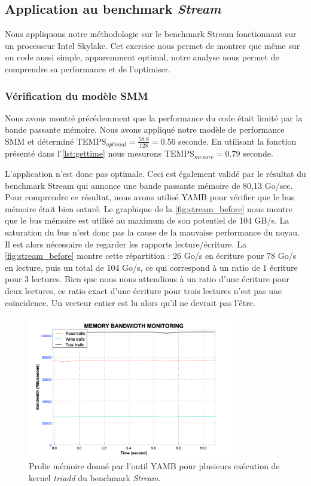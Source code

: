 \subsection{Application au benchmark \textit{Stream}}

Nous appliquons notre méthodologie sur le benchmark Stream fonctionnant sur un processeur Intel Skylake. Cet exercice nous permet de montrer que même sur un code aussi simple, apparemment optimal, notre analyse nous permet de comprendre sa performance et de l'optimiser.


\subsubsection{Vérification du modèle SMM}

Nous avons montré précédemment que la performance du code était limité par la bande passante mémoire. Nous avons appliqué notre modèle de performance SMM et déterminé $\text{TEMPS}_{optimal} = \frac{58.8}{128} = 0.56$ seconde. En utilisant la fonction présenté dans l'\autoref{lst:gettime} nous mesurons $\text{TEMPS}_{mesure} = 0.79$ seconde.

L'application n'est donc pas optimale. Ceci est également validé par le résultat du benchmark Stream qui annonce une bande passante mémoire de 80,13 Go/sec. Pour comprendre ce résultat, nous avons utilisé YAMB pour vérifier que le bus mémoire était bien saturé. Le graphique de la \autoref{fig:stream_before} nous montre que le bus mémoire est utilisé au maximum de son potentiel de 104 GB/s. La saturation du bus n'est donc pas la cause de la mauvaise performance du noyau. Il est alors nécessaire de regarder les rapports lecture/écriture. La \autoref{fig:stream_before} montre cette répartition : 26 Go/s en écriture pour 78 Go/s en lecture, puis un total de 104 Go/s, ce qui correspond à un ratio de 1 écriture pour 3 lectures. Bien que nous nous attendions à un ratio d'une écriture pour deux lectures, ce ratio exact d'une écriture pour trois lectures n'est pas une coïncidence. Un vecteur entier est lu alors qu'il ne devrait pas l'être.

\begin{figure}[htb]
{
\centering
\includegraphics[width=0.80\textwidth]{images/stream_before.png}
\caption{Prolie mémoire donné par l'outil YAMB pour plusieurs exécution de kernel \textit{triadd} du benchmark \textit{Stream}. }\label{fig:stream_before}
}
\end{figure}




